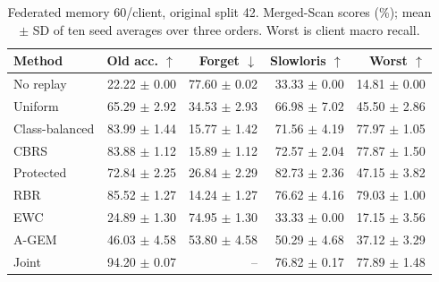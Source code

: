 \begin{table}[t]
\centering
\caption{Federated memory 60/client, original split 42. Merged-Scan scores (\%); mean $\pm$ SD of ten seed averages over three orders. Worst is client macro recall.}
\label{tab:main}
\footnotesize
\setlength{\tabcolsep}{2.5pt}
\begin{tabular}{lrrrr}
\toprule
Method & Old acc. $\uparrow$ & Forget $\downarrow$ & Slowloris $\uparrow$ & Worst $\uparrow$\\
\midrule
No replay & 22.22 $\pm$ 0.00 & 77.60 $\pm$ 0.02 & 33.33 $\pm$ 0.00 & 14.81 $\pm$ 0.00\\
Uniform & 65.29 $\pm$ 2.92 & 34.53 $\pm$ 2.93 & 66.98 $\pm$ 7.02 & 45.50 $\pm$ 2.86\\
Class-balanced & 83.99 $\pm$ 1.44 & 15.77 $\pm$ 1.42 & 71.56 $\pm$ 4.19 & 77.97 $\pm$ 1.05\\
CBRS & 83.88 $\pm$ 1.12 & 15.89 $\pm$ 1.12 & 72.57 $\pm$ 2.04 & 77.87 $\pm$ 1.50\\
Protected & 72.84 $\pm$ 2.25 & 26.84 $\pm$ 2.29 & 82.73 $\pm$ 2.36 & 47.15 $\pm$ 3.82\\
RBR & 85.52 $\pm$ 1.27 & 14.24 $\pm$ 1.27 & 76.62 $\pm$ 4.16 & 79.03 $\pm$ 1.00\\
EWC & 24.89 $\pm$ 1.30 & 74.95 $\pm$ 1.30 & 33.33 $\pm$ 0.00 & 17.15 $\pm$ 3.56\\
A-GEM & 46.03 $\pm$ 4.58 & 53.80 $\pm$ 4.58 & 50.29 $\pm$ 4.68 & 37.12 $\pm$ 3.29\\
Joint & 94.20 $\pm$ 0.07 & -- & 76.82 $\pm$ 0.17 & 77.89 $\pm$ 1.48\\
\bottomrule
\end{tabular}
\end{table}
